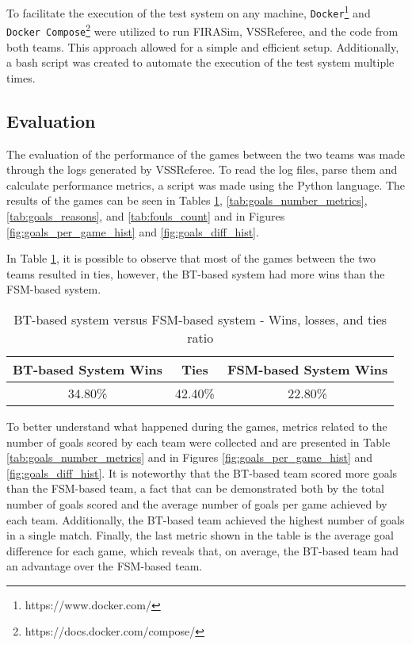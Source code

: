 To facilitate the execution of the test system on any machine, \texttt{Docker}\footnote{https://www.docker.com/} and \texttt{Docker Compose}\footnote{https://docs.docker.com/compose/} were utilized to run FIRASim, VSSReferee, and the code from both teams. This approach allowed for a simple and efficient setup. Additionally, a bash script was created to automate the execution of the test system multiple times.

\subsection{Evaluation}

The evaluation of the performance of the games between the two teams was made through the logs generated by VSSReferee. To read the log files, parse them and calculate performance metrics, a script was made using the Python language. The results of the games can be seen in Tables \ref{tab:wins}, \ref{tab:goals_number_metrics}, \ref{tab:goals_reasons}, and \ref{tab:fouls_count} and in Figures \ref{fig:goals_per_game_hist} and \ref{fig:goals_diff_hist}.

In Table \ref{tab:wins}, it is possible to observe that most of the games between the two teams resulted in ties, however, the BT-based system had more wins than the FSM-based system.

\begin{table}[h]
    \centering
    \begin{tabular}{c c c}
        \toprule
        BT-based System Wins & Ties    & FSM-based System Wins \\
        \midrule
        34.80\%              & 42.40\% & 22.80\%               \\
        \bottomrule
    \end{tabular}
    \caption{BT-based system versus FSM-based system - Wins, losses, and ties ratio}
    \label{tab:wins}
\end{table}

To better understand what happened during the games, metrics related to the number of goals scored by each team were collected and are presented in Table \ref{tab:goals_number_metrics} and in Figures \ref{fig:goals_per_game_hist} and \ref{fig:goals_diff_hist}. It is noteworthy that the BT-based team scored more goals than the FSM-based team, a fact that can be demonstrated both by the total number of goals scored and the average number of goals per game achieved by each team. Additionally, the BT-based team achieved the highest number of goals in a single match. Finally, the last metric shown in the table is the average goal difference for each game, which reveals that, on average, the BT-based team had an advantage over the FSM-based team.

